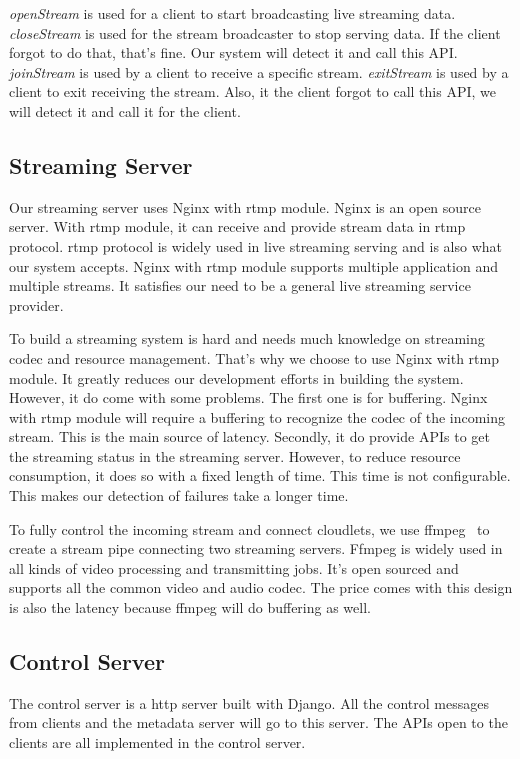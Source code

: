 \documentclass[letterpaper,twocolumn,10pt]{article}
\begin{document}
\emph{openStream} is used for a client to start broadcasting live streaming data. \emph{closeStream} is used for the stream broadcaster to stop serving data. If the client forgot to do that, that's fine. Our system will detect it and call this API. \emph{joinStream} is used by a client to receive a specific stream. \emph{exitStream} is used by a client to exit receiving the stream. Also, it the client forgot to call this API, we will detect it and call it for the client. 

\subsection{Streaming Server}
Our streaming server uses Nginx with rtmp module. Nginx is an open source server. With rtmp module, it can receive and provide stream data in rtmp protocol. rtmp protocol is widely used in live streaming serving and is also what our system accepts. Nginx with rtmp module supports multiple application and multiple streams. It satisfies our need to be a general live streaming service provider. 

To build a streaming system is hard and needs much knowledge on streaming codec and resource management. That's why we choose to use Nginx with rtmp module. It greatly reduces our development efforts in building the system. However, it do come with some problems. The first one is for buffering. Nginx with rtmp module will require a buffering to recognize the codec of the incoming stream. This is the main source of latency. Secondly, it do provide APIs to get the streaming status in the streaming server. However, to reduce resource consumption, it does so with a fixed length of time. This time is not configurable. This makes our detection of failures take a longer time.

To fully control the incoming stream and connect cloudlets, we use ffmpeg~\cite{tomar2006converting} to create a stream pipe connecting two streaming servers. Ffmpeg is widely used in all kinds of video processing and transmitting jobs. It's open sourced and supports all the common video and audio codec. The price comes with this design is also the latency because ffmpeg will do buffering as well.

\subsection{Control Server}
The control server is a http server built with Django. All the control messages from clients and the metadata server will go to this server. The APIs open to the clients are all implemented in the control server.
\end{document}
